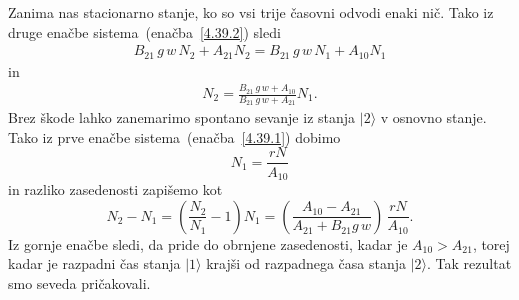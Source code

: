 Zanima nas stacionarno stanje, ko so vsi trije časovni odvodi enaki nič. 
Tako iz druge enačbe sistema~(enačba~\ref{4.39.2}) sledi
\begin{eqnarray}
B_{21}\,g\,w\, N_{2}+A_{21}N_{2} = B_{21}\,g\,w\, N_{1} + A_{10}N_{1} 
\end{eqnarray}
in
\begin{eqnarray}
N_2 = \frac{B_{21}\,g\,w + A_{10}}{B_{21}\,g\,w+A_{21}}N_1.  
\end{eqnarray}
Brez škode lahko zanemarimo spontano sevanje iz stanja
$|2\rangle$ v osnovno stanje. Tako iz prve enačbe sistema~(enačba~\ref{4.39.1}) dobimo
\begin{equation}
N_1= \frac{rN}{A_{10}}
\end{equation}
in razliko zasedenosti zapišemo kot 
\begin{equation}
N_{2}-N_{1}=\left(\frac{N_2}{N_1}-1\right)N_1=\left(\frac{A_{10}-A_{21}}{A_{21}+
B_{21}g\,w}\right)\,\frac{rN}{A_{10}}.
\label{4.42}
\end{equation}
Iz gornje enačbe sledi, da pride do obrnjene 
zasedenosti, kadar je $A_{10}>A_{21}$, torej kadar je
razpadni čas stanja $|1\rangle$ krajši od razpadnega časa stanja $|2\rangle$.
Tak rezultat smo seveda pričakovali.


